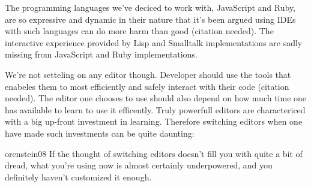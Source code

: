 The programming languages we've deciced to work with, JavaScript and Ruby, are
so expressive and dynamic in their nature that it's been argued using IDEs
with such languages can do more harm than good (citation needed). The
interactive experience provided by Lisp and Smalltalk implementations are
sadly missing from JavaScript and Ruby implementations.

We're not setteling on any editor though. Developer should use the tools
that enabeles them to most efficiently and safely interact with their code
(citation needed). The editor one chooses to use should also depend on how
much time one has available to learn to use it efficently. Truly powerfull
editors are charactericed with a big up-front investment in learning.
Therefore switching editors when one have made such investments can be quite
daunting:

\begin{citequote}{orenstein08}
  If the thought of switching editors doesn't fill you with quite a bit of
  dread, what you're using now is almost certainly underpowered, and you
  definitely haven't customized it enough.
\end{citequote}


